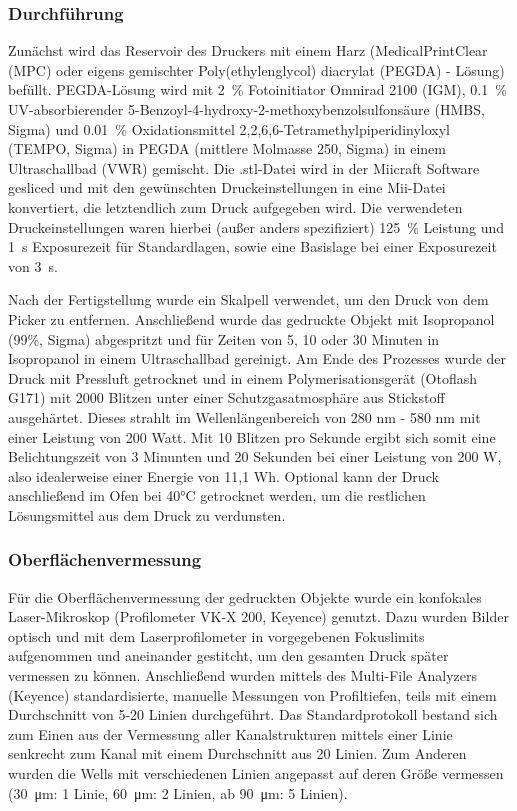 \subsubsection{Durchführung}

Zunächst wird das Reservoir des Druckers mit einem Harz (MedicalPrintClear (MPC) oder eigens gemischter Poly(ethylenglycol) diacrylat (PEGDA) - Lösung) befüllt. PEGDA-Lösung wird mit \SI{2}{\percent} Fotoinitiator Omnirad 2100 (IGM), \SI{0.1}{\percent} UV-absorbierender 5-Benzoyl-4-hydroxy-2-methoxybenzolsulfonsäure (HMBS, Sigma) und \SI{0.01}{\percent} Oxidationsmittel 2,2,6,6-Tetramethylpiperidinyloxyl (TEMPO, Sigma) in PEGDA (mittlere Molmasse 250, Sigma) in einem Ultraschallbad (VWR) gemischt. Die .stl-Datei wird in der Miicraft Software gesliced und mit den gewünschten Druckeinstellungen in eine Mii-Datei konvertiert, die letztendlich zum Druck aufgegeben wird. Die verwendeten Druckeinstellungen waren hierbei (außer anders spezifiziert) \SI{125}{\percent} Leistung und \SI{1}{s} Exposurezeit für Standardlagen, sowie eine Basislage bei einer Exposurezeit von \SI{3}{s}. 

Nach der Fertigstellung wurde ein Skalpell verwendet, um den Druck von dem Picker zu entfernen. Anschließend wurde das gedruckte Objekt mit Isopropanol (99\%, Sigma) abgespritzt und für Zeiten von 5, 10 oder 30 Minuten in Isopropanol in einem Ultraschallbad gereinigt. Am Ende des Prozesses wurde der Druck mit Pressluft getrocknet und in einem Polymerisationsgerät (Otoflash G171) mit 2000 Blitzen unter einer Schutzgasatmosphäre aus Stickstoff ausgehärtet. Dieses strahlt im Wellenlängenbereich von 280 nm - 580 nm mit einer Leistung von 200 Watt. Mit 10 Blitzen pro Sekunde ergibt sich somit eine Belichtungszeit von 3 Minunten und 20 Sekunden bei einer Leistung von 200 W, also idealerweise einer Energie von 11,1 Wh. Optional kann der Druck anschließend im Ofen bei 40°C getrocknet werden, um die restlichen Lösungsmittel aus dem Druck zu verdunsten.


\subsubsection{Oberflächenvermessung}

Für die Oberflächenvermessung der gedruckten Objekte wurde ein konfokales Laser-Mikroskop (Profilometer VK-X 200, Keyence) genutzt. Dazu wurden Bilder optisch und mit dem Laserprofilometer in vorgegebenen Fokuslimits aufgenommen und aneinander gestitcht, um den gesamten Druck später vermessen zu können. Anschließend wurden mittels des Multi-File Analyzers (Keyence) standardisierte, manuelle Messungen von Profiltiefen, teils mit einem Durchschnitt von 5-20 Linien durchgeführt. Das Standardprotokoll bestand sich zum Einen aus der Vermessung aller Kanalstrukturen mittels einer Linie senkrecht zum Kanal mit einem Durchschnitt aus 20 Linien. Zum Anderen wurden die Wells mit verschiedenen Linien angepasst auf deren Größe vermessen (\SI{30}{\micro\meter}: 1 Linie, \SI{60}{\micro\meter}: 2 Linien, ab \SI{90}{\micro\meter}: 5 Linien).

